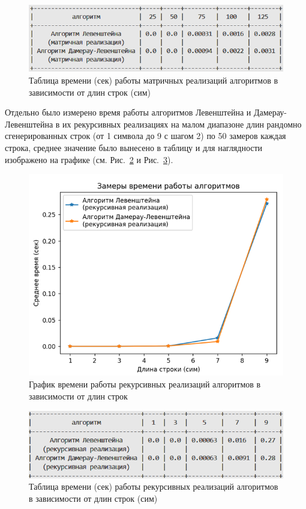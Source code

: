 \begin{figure}[H]
    \centering
    \includegraphics[width=1\textwidth]{img/table_mat.png}
    \caption{Таблица времени (сек) работы матричных реализаций алгоритмов в зависимости от длин строк (сим)}
    \label{fig:table_mat}
\end{figure}

Отдельно было измерено время работы алгоритмов Левенштейна и Дамерау-Левенштейна в их рекурсивных реализациях на малом диапазоне длин рандомно сгенерированных строк (от 1 символа до 9 с шагом 2) по 50 замеров каждая строка, среднее значение было вынесено в таблицу и для наглядности изображено на графике (см. Рис.~\ref{fig:graph_rec} и Рис.~\ref{fig:table_rec}).

\begin{figure}[H]
    \centering
    \includegraphics[width=1\textwidth]{img/graph_rec.png}
    \caption{График времени работы рекурсивных реализаций алгоритмов в зависимости от длин строк}
    \label{fig:graph_rec}
\end{figure}

\begin{figure}[H]
    \centering
    \includegraphics[width=1\textwidth]{img/table_rec.png}
    \caption{Таблица времени (сек) работы рекурсивных реализаций алгоритмов в зависимости от длин строк (сим)}
    \label{fig:table_rec}
\end{figure}

